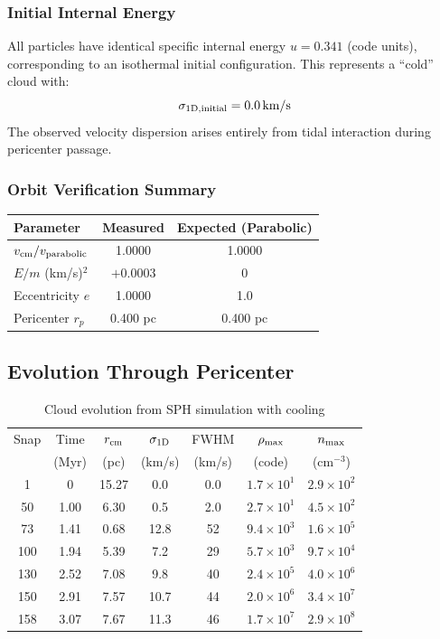 \documentclass[twocolumn,amsmath,amssymb,prd,superscriptaddress,nofootinbib]{revtex4-2}
\begin{document}
\subsubsection{Initial Internal Energy}
All particles have identical specific internal energy $u = 0.341$ (code units), corresponding to an isothermal initial configuration. This represents a ``cold'' cloud with:
\begin{equation}
    \sigma_{\rm 1D,initial} = 0.0\,{\rm km/s}
\end{equation}
The observed velocity dispersion arises entirely from tidal interaction during pericenter passage.

\subsubsection{Orbit Verification Summary}
\begin{center}
\begin{tabular}{lcc}
\toprule
Parameter & Measured & Expected (Parabolic) \\
\midrule
$v_{\rm cm}/v_{\rm parabolic}$ & 1.0000 & 1.0000 \\
$E/m$ (km/s)$^2$ & $+0.0003$ & $0$ \\
Eccentricity $e$ & 1.0000 & 1.0 \\
Pericenter $r_p$ & 0.400 pc & 0.400 pc \\
\bottomrule
\end{tabular}
\end{center}

\subsection{Evolution Through Pericenter}
\label{sec:evolution}

\begin{table}[h]
\centering
\caption{Cloud evolution from SPH simulation with cooling}
\label{tab:evolution}
\begin{tabular}{ccccccc}
\toprule
Snap & Time & $r_{\rm cm}$ & $\sigma_{\rm 1D}$ & FWHM & $\rho_{\rm max}$ & $n_{\rm max}$ \\
 & (Myr) & (pc) & (km/s) & (km/s) & (code) & (cm$^{-3}$) \\
\midrule
1 & 0 & 15.27 & 0.0 & 0.0 & $1.7\times 10^1$ & $2.9\times 10^2$ \\
50 & 1.00 & 6.30 & 0.5 & 2.0 & $2.7\times 10^1$ & $4.5\times 10^2$ \\
73 & 1.41 & 0.68 & 12.8 & 52 & $9.4\times 10^3$ & $1.6\times 10^5$ \\
100 & 1.94 & 5.39 & 7.2 & 29 & $5.7\times 10^3$ & $9.7\times 10^4$ \\
130 & 2.52 & 7.08 & 9.8 & 40 & $2.4\times 10^5$ & $4.0\times 10^6$ \\
150 & 2.91 & 7.57 & 10.7 & 44 & $2.0\times 10^6$ & $3.4\times 10^7$ \\
158 & 3.07 & 7.67 & 11.3 & 46 & $1.7\times 10^7$ & $2.9\times 10^8$ \\
\bottomrule
\end{tabular}
\end{table}
\end{document}
